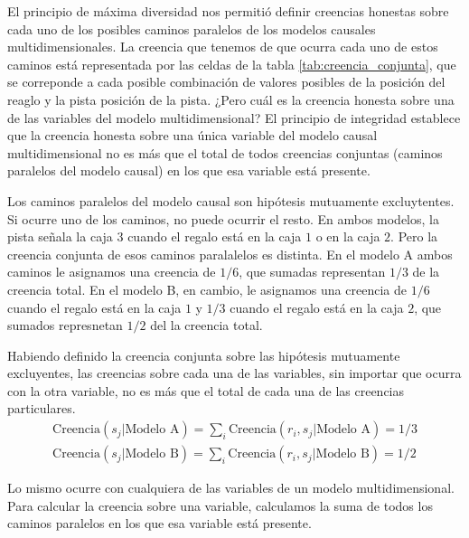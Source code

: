 \documentclass[a4paper,10pt]{book}
\theoremstyle{definition}
\begin{document}
El principio de máxima diversidad nos permitió definir creencias honestas sobre cada uno de los posibles caminos paralelos de los modelos causales multidimensionales.
La creencia que tenemos de que ocurra cada uno de estos caminos está representada por las celdas de la tabla \ref{tab:creencia_conjunta}, que se correponde a cada posible combinación de valores posibles de la posición del reaglo y la pista posición de la pista.
¿Pero cuál es la creencia honesta sobre una de las variables del modelo multidimensional?
El principio de integridad establece que la creencia honesta sobre una única variable del modelo causal multidimensional no es más que el total de todos creencias conjuntas (caminos paralelos del modelo causal) en los que esa variable está presente.

Los caminos paralelos del modelo causal son hipótesis mutuamente excluytentes.
Si ocurre uno de los caminos, no puede ocurrir el resto.
En ambos modelos, la pista señala la caja $3$ cuando el regalo está en la caja $1$ o en la caja $2$.
Pero la creencia conjunta de esos caminos paralalelos es distinta.
En el modelo A ambos caminos le asignamos una creencia de $1/6$, que sumadas representan $1/3$ de la creencia total.
En el modelo B, en cambio, le asignamos una creencia de $1/6$ cuando el regalo está en la caja $1$ y $1/3$ cuando el regalo está en la caja $2$, que sumados represnetan $1/2$ del la creencia total.


Habiendo definido la creencia conjunta sobre las hipótesis mutuamente excluyentes, las creencias sobre cada una de las variables, sin importar que ocurra con la otra variable, no es más que el total de cada una de las creencias particulares.
\begin{equation}
\begin{split}
\text{Creencia}(s_j|\text{Modelo A}) = \sum_i \text{Creencia}(r_i, s_j|\text{Modelo A}) = 1/3 \\  \text{Creencia}(s_j|\text{Modelo B}) = \sum_i \text{Creencia}(r_i, s_j|\text{Modelo B}) = 1/2
\end{split}
\end{equation}


Lo mismo ocurre con cualquiera de las variables de un modelo multidimensional.
Para calcular la creencia sobre una variable, calculamos la suma de todos los caminos paralelos en los que esa variable está presente.
\end{document}
